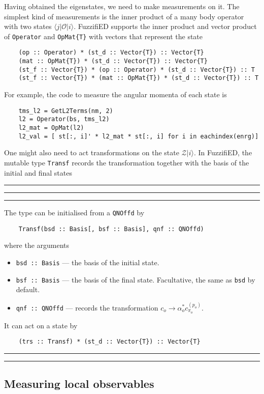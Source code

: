 \documentclass{timesjhep}
\newenvironment{block}[1]{\vspace{0.4\baselineskip}\hrule\vspace{0.10\baselineskip}\hrule\vspace{0.30\baselineskip}{\bfseries #1}\vspace{0.2\baselineskip}\hrule\vspace{0.3\baselineskip}
}{\vspace{0.2\baselineskip}\hrule\vspace{0.10\baselineskip}\hrule\vspace{0.5\baselineskip}}
\begin{document}
Having obtained the eigenstates, we need to make measurements on it. The simplest kind of measurements is the inner product of a many body operator with two states $\langle j|\mathcal{O}|i\rangle$. FuzzifiED supports the inner product and vector product of \lstinline|Operator| and \lstinline|OpMat{T}| with vectors that represent the state
\begin{lstlisting}
    (op :: Operator) * (st_d :: Vector{T}) :: Vector{T}
    (mat :: OpMat{T}) * (st_d :: Vector{T}) :: Vector{T}
    (st_f :: Vector{T}) * (op :: Operator) * (st_d :: Vector{T}) :: T
    (st_f :: Vector{T}) * (mat :: OpMat{T}) * (st_d :: Vector{T}) :: T
\end{lstlisting}
For example, the code to measure the angular momenta of each state is
\begin{lstlisting}
    tms_l2 = GetL2Terms(nm, 2)
    l2 = Operator(bs, tms_l2)
    l2_mat = OpMat(l2)
    l2_val = [ st[:, i]' * l2_mat * st[:, i] for i in eachindex(enrg)]
\end{lstlisting}

One might also need to act transformations on the state $\mathcal{Z}|i\rangle$. In FuzzifiED, the mutable type \lstinline|Transf| records the transformation together with the basis of the initial and final states 

\begin{block}{\lstinline|Transf| --- Type}
The type can be initialised from a \lstinline|QNOffd| by 
\begin{lstlisting}
    Transf(bsd :: Basis[, bsf :: Basis], qnf :: QNOffd)
\end{lstlisting}
where the arguments 
\begin{itemize}
    \item \lstinline|bsd :: Basis| --- the basis of the initial state.
    \item \lstinline|bsf :: Basis| --- the basis of the final state. Facultative, the same as \lstinline|bsd| by default.
    \item \lstinline|qnf :: QNOffd| --- records the transformation $c_o\to \alpha_o^* c^{(p_o)}_{\pi_o}$.
\end{itemize}
It can act on a state by 
\begin{lstlisting}
    (trs :: Transf) * (st_d :: Vector{T}) :: Vector{T}
\end{lstlisting}
\end{block}

\subsection{Measuring local observables}
\label{sec:ed_obs}
\end{document}
